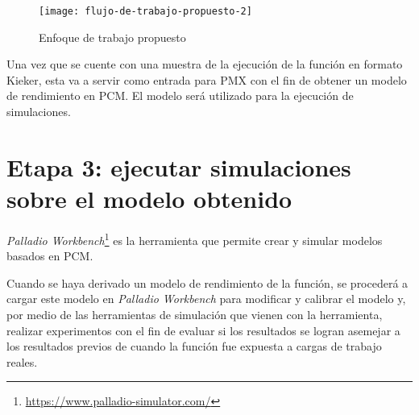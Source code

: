 \begin{figure}[h]
  \centering
  \texttt{[image: flujo-de-trabajo-propuesto-2]}
  \caption{Enfoque de trabajo propuesto}
  \label{fig:flujo-de-trabajo-propuesto}
\end{figure}

Una vez que se cuente con una muestra de la ejecución de la función en formato Kieker, esta va a servir como entrada para PMX con el fin de obtener un modelo de rendimiento en PCM. El modelo será utilizado para la ejecución de simulaciones.

\section{Etapa 3: ejecutar simulaciones sobre el modelo obtenido}
\emph{Palladio Workbench}\footnote{\url{https://www.palladio-simulator.com/}} es la herramienta que permite crear y simular modelos basados en PCM. 

Cuando se haya derivado un modelo de rendimiento de la función, se procederá a cargar este modelo en \emph{Palladio Workbench} para modificar y calibrar el modelo y, por medio de las herramientas de simulación que vienen con la herramienta, realizar experimentos con el fin de evaluar si los resultados se logran asemejar a los resultados previos de cuando la función fue expuesta a cargas de trabajo reales.